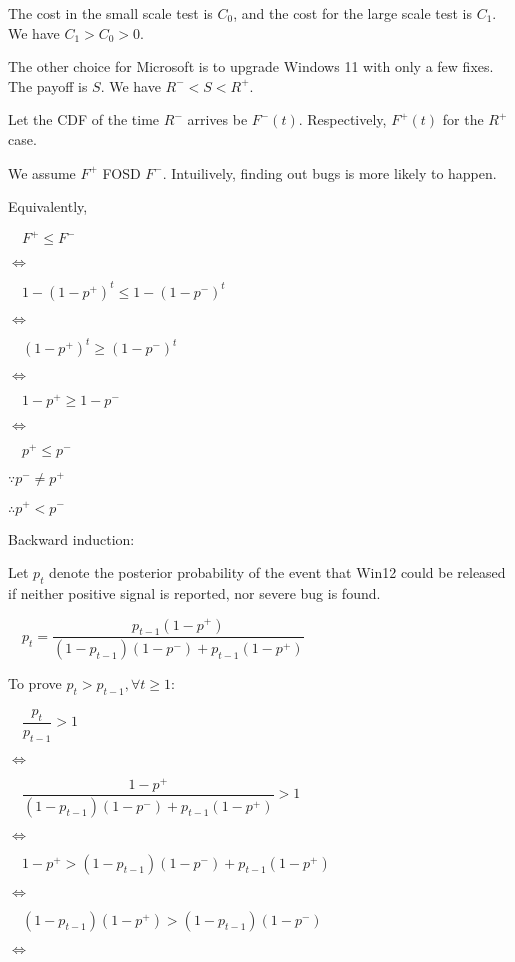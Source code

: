 \documentclass{article}
\begin{document}
The cost in the small scale test is $C_{0}$, and the cost for the large scale test is $C_{1}$. We have $C_{1}>C_{0}>0$.

The other choice for Microsoft is to upgrade Windows 11 with only a few fixes. The payoff is $S$. We have $R^{-}<S<R^{+}$.

Let the CDF of the time $R^{-}$ arrives be $F^{-}\left(t\right)$. Respectively, $F^{+}\left(t\right)$ for the $R^{+}$ case. 

We assume $F^{+}$ FOSD $F^{-}$. Intuilively, finding out bugs is more likely to happen. 

Equivalently,

$\quad F^{+}\leqslant F^{-}$

$\iff$

$\quad 1-\left(1-p^{+}\right)^{t}\leqslant1-\left(1-p^{-}\right)^{t}$

$\iff$

$\quad \left(1-p^{+}\right)^{t}\geqslant\left(1-p^{-}\right)^{t}$

$\iff$

$\quad 1-p^{+}\geqslant1-p^{-}$

$\iff$

$\quad p^{+}\leqslant p^{-}$

$\because p^{-}\neq p^{+}$

$\therefore p^{+}<p^{-}$

Backward induction:

Let $p_{t}$ denote the posterior probability of the event that Win12 could be released if neither positive signal is reported, nor severe bug is found. 

$ \quad p_{t}=\dfrac{p_{t-1}\left(1-p^{+}\right)}{\left(1-p_{t-1}\right)\left(1-p^{-}\right)+p_{t-1}\left(1-p^{+}\right)}$

To prove $p_{t}>p_{t-1}, \forall t\geqslant1$:

$\quad \dfrac{p_{t}}{p_{t-1}}>1$

$\iff$

$ \quad \dfrac{1-p^{+}}{\left(1-p_{t-1}\right)\left(1-p^{-}\right)+p_{t-1}\left(1-p^{+}\right)}>1$

$\iff$

$\quad 1-p^{+}>\left(1-p_{t-1}\right)\left(1-p^{-}\right)+p_{t-1}\left(1-p^{+}\right)$

$\iff$

$\quad \left(1-p_{t-1}\right)\left(1-p^{+}\right)>\left(1-p_{t-1}\right)\left(1-p^{-}\right)$

$\iff$
\end{document}
